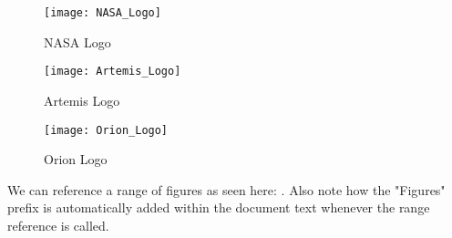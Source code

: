 \begin{minipage}[c]{0.33\textwidth}
   \begin{figure}[H]
      \centering
      \texttt{[image: NASA\_Logo]}
      \caption{NASA Logo} 
      \label{fig:nasa-logo}
   \end{figure}
\end{minipage}%
\begin{minipage}[c]{0.33\textwidth}
   \begin{figure}[H]
      \centering
      \texttt{[image: Artemis\_Logo]}
      \caption{Artemis Logo} 
      \label{fig:artemis-logo}
   \end{figure}
\end{minipage}
\begin{minipage}[c]{0.33\textwidth}
   \begin{figure}[H]
      \centering
      \texttt{[image: Orion\_Logo]}
      \caption{Orion Logo} 
      \label{fig:orion-logo}
   \end{figure}
\end{minipage}

\vspace{\baselineskip}

We can reference a range of figures as seen here: .
Also note how the "Figures" prefix is automatically added within the document text whenever the range reference is called.